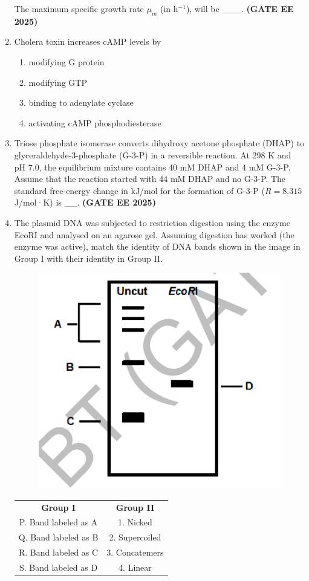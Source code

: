 \documentclass[journal,12pt,onecolumn]{IEEEtran}
\theoremstyle{remark}
\begin{document}
\begin{enumerate}
The maximum specific growth rate $\mu_m$ (in h$^{-1}$), will be \_\_\_.
\hfill \textbf{(GATE EE 2025)}
\item  Cholera toxin increases cAMP levels by
\begin{enumerate}
\item  modifying G protein
\item  modifying GTP
\item  binding to adenylate cyclase
\item  activating cAMP phosphodiesterase
\end{enumerate}

\item  Triose phosphate isomerase converts dihydroxy acetone phosphate (DHAP) to glyceraldehyde-3-phosphate (G-3-P) in a reversible reaction. At 298 K and pH 7.0, the equilibrium mixture contains 40 mM DHAP and 4 mM G-3-P. Assume that the reaction started with 44 mM DHAP and no G-3-P. The standard free-energy change in kJ/mol for the formation of G-3-P ($R=8.315$ J/mol·K) is \_\_. \hfill \textbf{(GATE EE 2025)}

\item  The plasmid DNA was subjected to restriction digestion using the enzyme  EcoRI and analysed on an agarose gel. Assuming digestion has worked (the enzyme was active), match the identity of DNA bands shown in the image in Group I with their identity in Group II.
\begin{figure}[H]
    \centering
    \includegraphics[width=0.4\linewidth]{figs/fig3.png}
    \caption{ }
    \label{fig3}
\end{figure}
\begin{tabular}{c c} 
      
\textbf{Group I} & \textbf{Group II}\\
P. Band labeled as A &   1. Nicked\\
Q. Band labeled as B &   2. Supercoiled\\
R. Band labeled as C &   3. Concatemers\\
S. Band labeled as D &  4. Linear\\
\end{tabular}


\end{enumerate}
\end{document}
